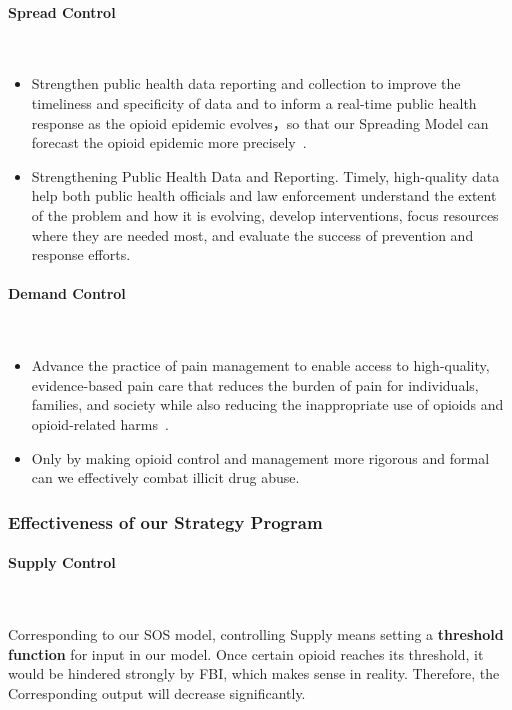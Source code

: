 \documentclass{mcmthesis}
\begin{document}
\paragraph{\textbf{Spread Control}}

~\smallskip

\begin{itemize}
    \item Strengthen public health data reporting and collection to improve the timeliness and specificity of data and to inform a real-time public health response as the opioid epidemic evolves，so that our Spreading Model can forecast the opioid epidemic more precisely~\cite{AWSARE2019}.
    \item Strengthening Public Health Data and Reporting. Timely, high-quality data help both public health officials and law enforcement understand the extent of the problem and how it is evolving, develop interventions, focus resources where they are needed most, and evaluate the success of prevention and response efforts. 
\end{itemize}

\paragraph{\textbf{Demand Control}}
~\smallskip

\begin{itemize}
    \item Advance the practice of pain management to enable access to high-quality, evidence-based pain care that reduces the burden of pain for individuals, families, and society while also reducing the inappropriate use of opioids and opioid-related harms~\cite{SEIGERMAN201928}.
    \item Only by making opioid control and management more rigorous and formal can we effectively combat illicit drug abuse.
\end{itemize}

\subsubsection{Effectiveness of our Strategy Program}
\paragraph{\textbf{Supply Control}}

~\smallskip

Corresponding to our SOS model, controlling Supply means setting a \textbf{threshold function} for input in our model. Once certain opioid reaches its threshold, it would be hindered strongly by FBI, which makes sense in reality. Therefore, the Corresponding output will decrease significantly.
\end{document}
